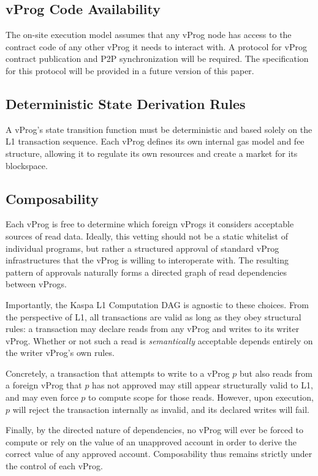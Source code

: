 \documentclass[onecolumn, 9pt, a4paper]{extarticle}
\begin{document}
\subsection{vProg Code Availability}
The on-site execution model assumes that any vProg node has access to the contract code of any other vProg it needs to interact with. A protocol for vProg contract publication and P2P synchronization will be required. The specification for this protocol will be provided in a future version of this paper.

\subsection{Deterministic State Derivation Rules}
A vProg's state transition function must be deterministic and based solely on the L1 transaction sequence.
Each vProg defines its own internal gas model and fee structure, allowing it to regulate its own resources and create a market for its blockspace.

\subsection{Composability}
Each vProg is free to determine which foreign vProgs it considers acceptable sources of read data. Ideally, this vetting should not be a static whitelist of individual programs, but rather a structured approval of standard vProg infrastructures that the vProg is willing to interoperate with. The resulting pattern of approvals naturally forms a directed graph of read dependencies between vProgs.

Importantly, the Kaspa L1 Computation DAG is agnostic to these choices. From the perspective of L1, all transactions are valid as long as they obey structural rules: a transaction may declare reads from any vProg and writes to its writer vProg. Whether or not such a read is \emph{semantically} acceptable depends entirely on the writer vProg’s own rules.

Concretely, a transaction that attempts to write to a vProg $p$ but also reads from a foreign vProg that $p$ has not approved may still appear structurally valid to L1, and may even force $p$ to compute scope for those reads. However, upon execution, $p$ will reject the transaction internally as invalid, and its declared writes will fail.

Finally, by the directed nature of dependencies, no vProg will ever be forced to compute or rely on the value of an unapproved account in order to derive the correct value of any approved account. Composability thus remains strictly under the control of each vProg.
\end{document}
